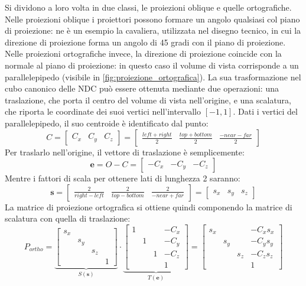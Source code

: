 Si dividono a loro volta in due classi, le proiezioni oblique e quelle ortografiche.
Nelle proiezioni oblique i proiettori possono formare un angolo qualsiasi col piano di proiezione: ne è un esempio la cavaliera, utilizzata nel disegno tecnico, in cui la direzione di proiezione forma un angolo di 45 gradi con il piano di proiezione.
Nelle proiezioni ortografiche invece, la direzione di proiezione coincide con la normale al piano di proiezione: in questo caso il volume di vista corrisponde a un parallelepipedo (visibile in \cref{fig:proiezione_ortografica}).
La sua trasformazione nel cubo canonico delle NDC può essere ottenuta mediante due operazioni: una traslazione, che porta il centro del volume di vista nell’origine, e una scalatura, che riporta le coordinate dei suoi vertici nell’intervallo $[-1, 1]$.
Dati i vertici del parallelepipedo, il suo centroide è identificato dal punto:
\[
    C =
    \begin{bmatrix} C_x & C_y & C_z \end{bmatrix} =
    \begin{bmatrix}
        \frac{left + right}{2} &
        \frac{top + bottom}{2} &
        \frac{-near - far}{2}
    \end{bmatrix}
\]
Per traslarlo nell'origine, il vettore di traslazione è semplicemente:
\[
    \mathbf{e} = O - C = \begin{bmatrix} -C_x & -C_y & -C_z \end{bmatrix}
\]
Mentre i fattori di scala per ottenere lati di lunghezza 2 saranno:
\[
    \mathbf{s} =
    \begin{bmatrix}
        \frac{2}{right - left} &
        \frac{2}{top - bottom} &
        \frac{2}{-near + far}
    \end{bmatrix}
    = \begin{bmatrix} s_x & s_y & s_z \end{bmatrix}
\]
La matrice di proiezione ortografica si ottiene quindi componendo la matrice di scalatura con quella di traslazione:
\[
    P_{ortho} =
    \underbrace{
        \begin{bmatrix}
            s_x &  &  &  \\
             & s_y &  &  \\
             &  & s_z &  \\
             &  &  & 1
        \end{bmatrix}
    }_{S(\mathbf{s})}
    \cdot
    \underbrace{
        \begin{bmatrix}
            1 &  &  & -C_x \\
             & 1 &  & -C_y \\
             &  & 1 & -C_z \\
             &  &  & 1
        \end{bmatrix}
    }_{T(\mathbf{e})}
    =
    \begin{bmatrix}
        s_x &  &  & -C_x s_x \\
         & s_y &  & -C_y s_y \\
         &  & s_z & -C_z s_z \\
         &  &  & 1
    \end{bmatrix}
\]

